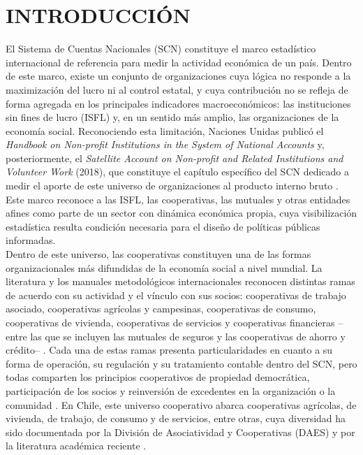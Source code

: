 \chapter{INTRODUCCIÓN}
\label{ch:intro}
 
El Sistema de Cuentas Nacionales (SCN) constituye el marco estadístico internacional de referencia para medir la actividad económica de un país. Dentro de este marco, existe un conjunto de organizaciones cuya lógica no responde a la maximización del lucro ni al control estatal, y cuya contribución no se refleja de forma agregada en los principales indicadores macroeconómicos: las instituciones sin fines de lucro (ISFL) y, en un sentido más amplio, las organizaciones de la economía social. Reconociendo esta limitación, Naciones Unidas publicó el \textit{Handbook on Non-profit Institutions in the System of National Accounts} y, posteriormente, el \textit{Satellite Account on Non-profit and Related Institutions and Volunteer Work} (2018), que constituye el capítulo específico del SCN dedicado a medir el aporte de este universo de organizaciones al producto interno bruto \cite{vereinte_nationen_satellite_2018}. Este marco reconoce a las ISFL, las cooperativas, las mutuales y otras entidades afines como parte de un sector con dinámica económica propia, cuya visibilización estadística resulta condición necesaria para el diseño de políticas públicas informadas.\\
 
Dentro de este universo, las cooperativas constituyen una de las formas organizacionales más difundidas de la economía social a nivel mundial. La literatura y los manuales metodológicos internacionales reconocen distintas ramas de acuerdo con su actividad y el vínculo con sus socios: cooperativas de trabajo asociado, cooperativas agrícolas y campesinas, cooperativas de consumo, cooperativas de vivienda, cooperativas de servicios y cooperativas financieras --entre las que se incluyen las mutuales de seguros y las cooperativas de ahorro y crédito-- \cite{barea_tejeiro_manual_2007}. Cada una de estas ramas presenta particularidades en cuanto a su forma de operación, su regulación y su tratamiento contable dentro del SCN, pero todas comparten los principios cooperativos de propiedad democrática, participación de los socios y reinversión de excedentes en la organización o la comunidad . En Chile, este universo cooperativo abarca cooperativas agrícolas, de vivienda, de trabajo, de consumo y de servicios, entre otras, cuya diversidad ha sido documentada por la División de Asociatividad y Cooperativas (DAES) y por la literatura académica reciente .\\
 
